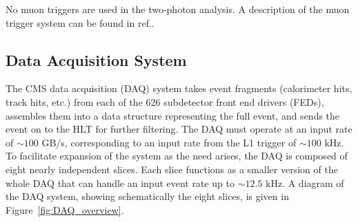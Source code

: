 \documentclass[dissertation.tex]{subfiles}
\begin{document}
No muon triggers are used in the two-photon analysis.  A description of the muon trigger system can be found in ref.\cite{CMS_detector_paper}.

\subsection{Data Acquisition System}
\label{sec:Data Acquisition System}

The CMS data acquisition (DAQ) system takes event fragments (calorimeter hits, track hits, etc.) from each of the 626 subdetector front end drivers (FEDs), assembles them into a data structure representing the full event, and sends the event on to the HLT for further filtering.  The DAQ must operate at an input rate of $\sim100$ GB/s, corresponding to an input rate from the L1 trigger of $\sim100$ kHz.  To facilitate expansion of the system as the need arises, the DAQ is composed of eight nearly independent slices.  Each slice functions as a smaller version of the whole DAQ that can handle an input event rate up to $\sim12.5$ kHz.  A diagram of the DAQ system, showing schematically the eight slices, is given in Figure~\ref{fig:DAQ_overview}.
\end{document}
